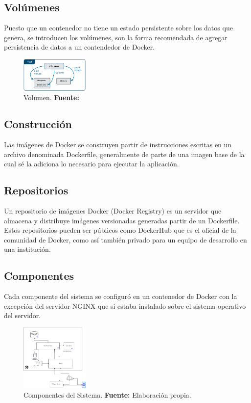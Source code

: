 \subsection{Volúmenes}
Puesto que un contenedor no tiene un estado persistente sobre los datos que genera, se introducen
los volúmenes, son la forma recomendada de agregar persistencia de datos a un contendedor de
Docker. \cite{Docker}
\begin{figure}[H]
	\begin{centering}
		\includegraphics[angle=0,width=0.3\textwidth]{Figuras/docker-volume.png}
		\par \end{centering}
	\caption[Volumen]{Volumen. \textbf{Fuente:} \cite{Docker}}
	\label{Volumen}
\end{figure}

\subsection{Construcción}
Las imágenes de Docker se construyen partir de instrucciones escritas en un archivo denominada
Dockerfile, generalmente de parte de una imagen base de la cual sé la adiciona lo necesario para
ejecutar la aplicación.
\cite{Docker}

\subsection{Repositorios}
Un repositorio de imágenes Docker (Docker Registry) es un servidor que almacena y distribuye
imágenes versionadas generadas partir de un Dockerfile. Estos repositorios pueden ser públicos como
DockerHub que es el oficial de la comunidad de Docker, como así también privado para un equipo de
desarrollo en una institución. \cite{Docker}

\subsection{Componentes}
Cada componente del sistema se configuró en un contenedor de Docker con la excepción del servidor
NGINX que si estaba instalado sobre el sistema operativo del servidor.
\begin{figure}[H]
	\begin{centering}
		\includegraphics[angle=0,width=0.3\textwidth]{Figuras/server.png}
		\par \end{centering}
	\caption[Componentes del Sistema]{Componentes del Sistema. \textbf{Fuente:} Elaboración propia.}
	\label{Componentes}
\end{figure}
